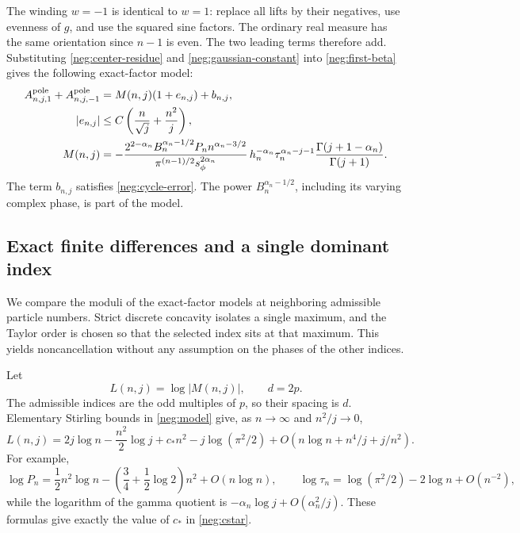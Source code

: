 \documentclass[11pt]{article}
\numberwithin{equation}{section}
\theoremstyle{definition}
\begin{document}
The winding \(w=-1\) is identical to \(w=1\): replace all
lifts by their negatives, use evenness of \(g\), and use the
squared sine factors.  The ordinary real measure has the same
orientation since \(n-1\) is even.  The two leading terms
therefore add.  Substituting \eqref{neg:center-residue} and
\eqref{neg:gaussian-constant} into \eqref{neg:first-beta}
gives the following exact-factor model:
\begin{align}
 A^{\rm pole}_{n,j,1}+A^{\rm pole}_{n,j,-1}
 &=M(n,j)(1+e_{n,j})+b_{n,j},
 \label{neg:local-model}\\
 |e_{n,j}|&\le C\left(\frac n{\sqrt j}+\frac{n^2}{j}\right),
 \label{neg:local-error}\\
 M(n,j)&=
 -\frac{2^{2-\alpha_n}B_n^{\alpha_n-1/2}P_n
                         n^{\alpha_n-3/2}}
        {\pi^{(n-1)/2}s_\phi^{2\alpha_n}}\,
 h_n^{-\alpha_n}\tau_n^{\alpha_n-j-1}
       \frac{\Gamma(j+1-\alpha_n)}{\Gamma(j+1)} .
 \label{neg:model}
\end{align}
The term \(b_{n,j}\) satisfies \eqref{neg:cycle-error}.
The power \(B_n^{\alpha_n-1/2}\), including its varying
complex phase, is part of the model.

\subsection{Exact finite differences and a single dominant index}
\label{neg:dominance}

We compare the moduli of the exact-factor models at neighboring
admissible particle numbers. Strict discrete concavity isolates a
single maximum, and the Taylor order is chosen so that the selected
index sits at that maximum. This yields noncancellation without any
assumption on the phases of the other indices.

Let
\[
 L(n,j)=\log|M(n,j)|,\qquad d=2p .
 \]
The admissible indices are the odd multiples of \(p\), so their
spacing is \(d\).  Elementary Stirling bounds in
\eqref{neg:model} give, as \(n\to\infty\) and \(n^2/j\to0\),
\begin{equation}
 L(n,j)=2j\log n-\frac{n^2}{2}\log j+c_*n^2
         -j\log(\pi^2/2)
         +O(n\log n+n^4/j+j/n^2).
 \label{neg:L-asymptotic}
\end{equation}
For example,
\[
 \log P_n=\frac12n^2\log n
             -\left(\frac34+\frac12\log2\right)n^2
             +O(n\log n),
 \qquad
 \log\tau_n=\log(\pi^2/2)-2\log n+O(n^{-2}),
 \]
while the logarithm of the gamma quotient is
\(-\alpha_n\log j+O(\alpha_n^2/j)\).
These formulas give exactly the value of \(c_*\) in
\eqref{neg:cstar}.
\end{document}
